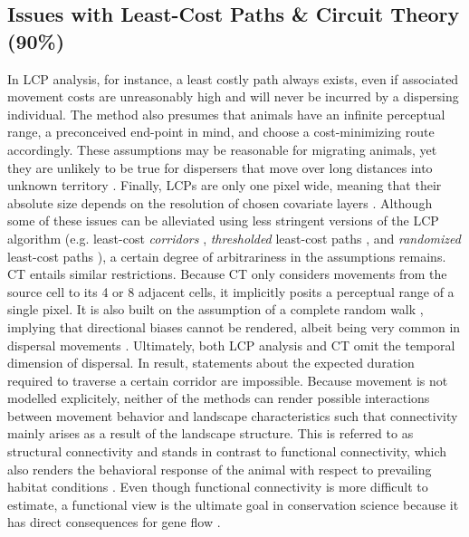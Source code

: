 \documentclass[abstract=on,10pt,a4paper,bibliography=totocnumbered]{article}
\begin{document}
\subsection{Issues with Least-Cost Paths \& Circuit Theory (90\%)}
In LCP analysis, for instance, a least costly path always exists, even if
associated movement costs are unreasonably high and will never be incurred by a
dispersing individual. The method also presumes that animals have an infinite
perceptual range, a preconceived end-point in mind, and choose a cost-minimizing
route accordingly. These assumptions may be reasonable for migrating animals,
yet they are unlikely to be true for dispersers that move over long distances
into unknown territory \citep{Koen.2014, Abrahms.2017, Cozzi.2020}. Finally,
LCPs are only one pixel wide, meaning that their absolute size depends on the
resolution of chosen covariate layers \citep{Diniz.2020}. Although some of these
issues can be alleviated using less stringent versions of the LCP algorithm
(e.g. least-cost \textit{corridors} \citep{Pinto.2009}, \textit{thresholded}
least-cost paths \citep{Landguth.2012}, and \textit{randomized} least-cost paths
\citep{Panzacchi.2016, VanMoorter.2021}), a certain degree of arbitrariness in
the assumptions remains. CT entails similar restrictions. Because CT only
considers movements from the source cell to its 4 or 8 adjacent cells, it
implicitly posits a perceptual range of a single pixel. It is also built on the
assumption of a complete random walk \citep{Diniz.2020}, implying that
directional biases cannot be rendered, albeit being very common in dispersal
movements \citep{Cozzi.2020, Hofmann.2021}. Ultimately, both LCP analysis and CT
omit the temporal dimension of dispersal. In result, statements about the
expected duration required to traverse a certain corridor are impossible.
Because movement is not modelled explicitely, neither of the methods can render
possible interactions between movement behavior and landscape characteristics
such that connectivity mainly arises as a result of the landscape structure.
This is referred to as structural connectivity and stands in contrast to
functional connectivity, which also renders the behavioral response of the
animal with respect to prevailing habitat conditions \citep{Tischendorf.2000}.
Even though functional connectivity is more difficult to estimate, a functional
view is the ultimate goal in conservation science because it has direct
consequences for gene flow \citep{Baguette.2013}.
\end{document}
